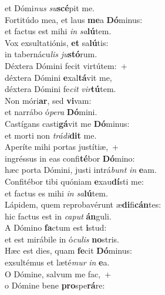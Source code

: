 \oddverse et Dómi\textit{nus} \textit{su}\textbf{scé}pit me.\\
\evenverse Fortitúdo mea, et laus \textbf{me}a \textbf{Dó}minus:~\*\\
\evenverse et factus est mihi \textit{in} \textit{sa}\textbf{lú}tem.\\
\oddverse Vox exsultatiónis, \textbf{et} sa\textbf{lú}tis:~\*\\
\oddverse in tabernácu\textit{lis} \textit{ju}\textbf{stó}rum.\\
\evenverse Déxtera Dómini fecit virtútem:~+\\
\evenverse  déxtera Dómini \textbf{e}xal\textbf{tá}vit me,~\*\\
\evenverse déxtera Dómini fe\textit{cit} \textit{vir}\textbf{tú}tem.\\
\oddverse Non móri\textbf{ar}, sed \textbf{vi}vam:~\*\\
\oddverse et narrábo ó\textit{pe}\textit{ra} \textbf{Dó}mini.\\
\evenverse Castígans casti\textbf{gá}vit me \textbf{Dó}minus:~\*\\
\evenverse et morti non \textit{trá}\textit{di}\textbf{dit} me.\\
\oddverse Aperíte mihi portas justítiæ,~+\\
\oddverse  ingréssus in eas confi\textbf{té}bor \textbf{Dó}mino:~\*\\
\oddverse hæc porta Dómini, justi intrá\textit{bunt} \textit{in} \textbf{e}am.\\
\evenverse Confitébor tibi quóniam \textbf{e}xau\textbf{dí}sti me:~\*\\
\evenverse et factus es mihi \textit{in} \textit{sa}\textbf{lú}tem.\\
\oddverse Lápidem, quem reprobavérunt æ\textbf{di}fi\textbf{cán}tes:~\*\\
\oddverse hic factus est in \textit{ca}\textit{put} \textbf{án}guli.\\
\evenverse A Dómino \textbf{fa}ctum est \textbf{i}stud:~\*\\
\evenverse et est mirábile in ó\textit{cu}\textit{lis} \textbf{no}stris.\\
\oddverse Hæc est dies, quam \textbf{fe}cit \textbf{Dó}minus:~\*\\
\oddverse exsultémus et læté\textit{mur} \textit{in} \textbf{e}a.\\
\evenverse O Dómine, salvum me fac,~+\\
\evenverse  o Dómine bene \textbf{pro}spe\textbf{rá}re:~\*\\
